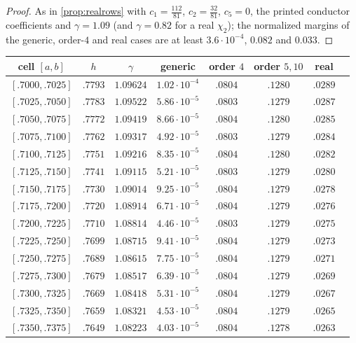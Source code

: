 \begin{proof}
As in \cref{prop:realrows} with $c_1=\frac{112}{81}$, $c_2=\frac{32}{81}$, $c_5=0$, the printed conductor
coefficients and $\gamma=1.09$ (and $\gamma=0.82$ for a real $\chi_2$); the normalized margins of the
generic, order-$4$ and real cases are at least $3.6\cdot10^{-4}$, $0.082$ and $0.033$.
\end{proof}

\begin{table}[ht]
\centering
\scriptsize
\begin{tabular}{@{}cccccccc@{}}
\toprule
cell $[a,b]$ & $h$ & $\gamma$ & generic & order $4$ & order $5,10$ & real & \\
\midrule
$[.7000,.7025]$ & $.7793$ & $1.09624$ & $1.02\cdot10^{-4}$ & $.0804$ & $.1280$ & $.0289$\\
$[.7025,.7050]$ & $.7783$ & $1.09522$ & $5.86\cdot10^{-5}$ & $.0803$ & $.1279$ & $.0287$\\
$[.7050,.7075]$ & $.7772$ & $1.09419$ & $8.66\cdot10^{-5}$ & $.0804$ & $.1280$ & $.0285$\\
$[.7075,.7100]$ & $.7762$ & $1.09317$ & $4.92\cdot10^{-5}$ & $.0803$ & $.1279$ & $.0284$\\
$[.7100,.7125]$ & $.7751$ & $1.09216$ & $8.35\cdot10^{-5}$ & $.0804$ & $.1280$ & $.0282$\\
$[.7125,.7150]$ & $.7741$ & $1.09115$ & $5.21\cdot10^{-5}$ & $.0803$ & $.1279$ & $.0280$\\
$[.7150,.7175]$ & $.7730$ & $1.09014$ & $9.25\cdot10^{-5}$ & $.0804$ & $.1279$ & $.0278$\\
$[.7175,.7200]$ & $.7720$ & $1.08914$ & $6.71\cdot10^{-5}$ & $.0804$ & $.1279$ & $.0276$\\
$[.7200,.7225]$ & $.7710$ & $1.08814$ & $4.46\cdot10^{-5}$ & $.0803$ & $.1279$ & $.0275$\\
$[.7225,.7250]$ & $.7699$ & $1.08715$ & $9.41\cdot10^{-5}$ & $.0804$ & $.1279$ & $.0273$\\
$[.7250,.7275]$ & $.7689$ & $1.08615$ & $7.75\cdot10^{-5}$ & $.0804$ & $.1279$ & $.0271$\\
$[.7275,.7300]$ & $.7679$ & $1.08517$ & $6.39\cdot10^{-5}$ & $.0804$ & $.1279$ & $.0269$\\
$[.7300,.7325]$ & $.7669$ & $1.08418$ & $5.31\cdot10^{-5}$ & $.0804$ & $.1279$ & $.0267$\\
$[.7325,.7350]$ & $.7659$ & $1.08321$ & $4.53\cdot10^{-5}$ & $.0804$ & $.1279$ & $.0265$\\
$[.7350,.7375]$ & $.7649$ & $1.08223$ & $4.03\cdot10^{-5}$ & $.0804$ & $.1278$ & $.0263$\\

\end{tabular}
\end{table}
